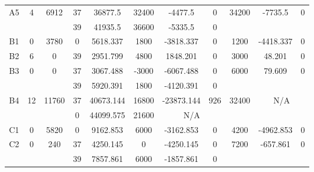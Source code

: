 \begin{sidewaystable}
\begin{tabular}{c||c|c||c|c|c|c|c||c|c|c}
        
      \\
      \hline
      \multirow{2}{*}{A5} &
      \multirow{2}{*}{4} &
      \multirow{2}{*}{6912} &
      37 &
      36877.5 &
      32400 &
        -4477.5 &
        0 &
      \multirow{2}{*}{34200} &
        \multirow{2}{*}{-7735.5} &
        \multirow{2}{*}{0}
      \\
      \cline{4-8}
       &
       &
       &
      39 &
      41935.5 &
      36600 &
        -5335.5 &
        0 &
      
         &
        
      \\
      \hline
      \multirow{1}{*}{B1} &
      \multirow{1}{*}{0} &
      \multirow{1}{*}{3780} &
      0 &
      5618.337 &
      1800 &
        -3818.337 &
        0 &
      \multirow{1}{*}{1200} &
        \multirow{1}{*}{-4418.337} &
        \multirow{1}{*}{0}
      \\
      \hline
      \multirow{1}{*}{B2} &
      \multirow{1}{*}{6} &
      \multirow{1}{*}{0} &
      39 &
      2951.799 &
      4800 &
        1848.201 &
        0 &
      \multirow{1}{*}{3000} &
        \multirow{1}{*}{48.201} &
        \multirow{1}{*}{0}
      \\
      \hline
      \multirow{2}{*}{B3} &
      \multirow{2}{*}{0} &
      \multirow{2}{*}{0} &
      37 &
      3067.488 &
      -3000 &
        -6067.488 &
        0 &
      \multirow{2}{*}{6000} &
        \multirow{2}{*}{79.609} &
        \multirow{2}{*}{0}
      \\
      \cline{4-8}
       &
       &
       &
      39 &
      5920.391 &
      1800 &
        -4120.391 &
        0 &
      
         &
        
      \\
      \hline
      \multirow{2}{*}{B4} &
      \multirow{2}{*}{12} &
      \multirow{2}{*}{11760} &
      37 &
      40673.144 &
      16800 &
        -23873.144 &
        926 &
      \multirow{2}{*}{32400} &
        \multicolumn{2}{c}{\multirow{2}{*}{N/A}}
      \\
      \cline{4-8}
       &
       &
       &
      0 &
      44099.575 &
      21600 &
        \multicolumn{2}{|c||}{N/A} &
      
        
      \\
      \hline
      \multirow{1}{*}{C1} &
      \multirow{1}{*}{0} &
      \multirow{1}{*}{5820} &
      0 &
      9162.853 &
      6000 &
        -3162.853 &
        0 &
      \multirow{1}{*}{4200} &
        \multirow{1}{*}{-4962.853} &
        \multirow{1}{*}{0}
      \\
      \hline
      \multirow{2}{*}{C2} &
      \multirow{2}{*}{0} &
      \multirow{2}{*}{240} &
      37 &
      4250.145 &
      0 &
        -4250.145 &
        0 &
      \multirow{2}{*}{7200} &
        \multirow{2}{*}{-657.861} &
        \multirow{2}{*}{0}
      \\
      \cline{4-8}
       &
       &
       &
      39 &
      7857.861 &
      6000 &
        -1857.861 &
        0 &
      

\end{tabular}
\end{sidewaystable}

